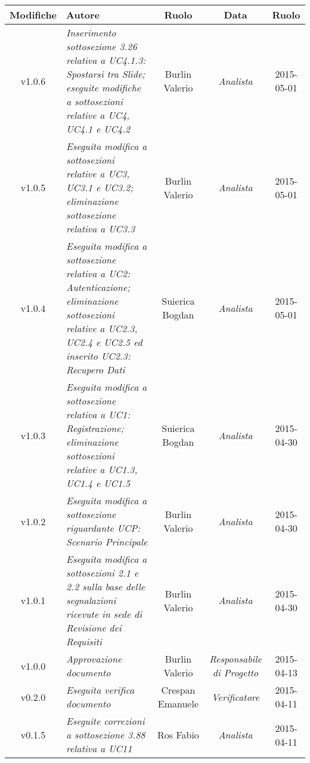 \newpage
\begin{table}[h]
\centering
\begin{tabular}{|c|p{}|c|c|c|}
	\toprule
		\textbf{Modifiche} & \textbf{Autore} & \textbf{Ruolo} & \textbf{Data} & \textbf{Ruolo} \\
	\midrule
	\midrule
		v1.0.6 & \textit{Inserimento sottosezione 3.26 relativa a UC4.1.3: Spostarsi tra Slide; eseguite modifiche a sottosezioni relative a UC4, UC4.1 e UC4.2} & Burlin Valerio & \textit{Analista} & 2015-05-01\\
	\midrule
		v1.0.5 & \textit{Eseguita modifica a sottosezioni relative a UC3, UC3.1 e UC3.2; eliminazione sottosezione relativa a UC3.3} & Burlin Valerio & \textit{Analista} & 2015-05-01\\
	\midrule
		v1.0.4 & \textit{Eseguita modifica a sottosezione relativa a UC2: Autenticazione; eliminazione sottosezioni relative a UC2.3, UC2.4 e UC2.5 ed inserito UC2.3: Recupero Dati} & Suierica Bogdan & \textit{Analista} & 2015-05-01\\
	\midrule
		v1.0.3 & \textit{Eseguita modifica a sottosezione relativa a UC1: Registrazione; eliminazione sottosezioni relative a UC1.3, UC1.4 e UC1.5} & Suierica Bogdan & \textit{Analista} & 2015-04-30\\
	\midrule
		v1.0.2 & \textit{Eseguita modifica a sottosezione riguardante UCP: Scenario Principale} & Burlin Valerio & \textit{Analista} & 2015-04-30\\
	\midrule
		v1.0.1 & \textit{Eseguita modifica a sottosezioni 2.1 e 2.2 sulla base delle segnalazioni ricevute in sede di Revisione dei Requisiti} & Burlin Valerio & \textit{Analista} & 2015-04-30\\
	\midrule
		v1.0.0 & \textit{Approvazione documento} & Burlin Valerio & \textit{Responsabile di Progetto} & 2015-04-13\\
	\midrule
		v0.2.0 & \textit{Eseguita verifica documento} & Crespan Emanuele & \textit{Verificatore} & 2015-04-11\\
	\midrule
		v0.1.5 & \textit{Eseguite correzioni a sottosezione 3.88 relativa a UC11} & Ros Fabio & \textit{Analista} & 2015-04-11\\
	\bottomrule
\end{tabular}
\end{table}
\newpage
